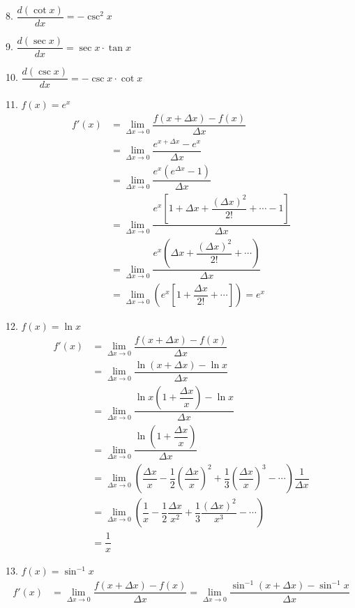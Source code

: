

8. $\dfrac{d (\cot x)}{dx} = -\csc^2 x$

9. $\dfrac{d (\sec x)}{dx} = \sec x \cdot \tan x$

10. $\dfrac{d (\csc x)}{dx} = -\csc x \cdot \cot x$

11. $f(x) = e^x$
\begin{align*}
    f'(x) &= \lim_{\Delta x \to 0} \dfrac{f(x+\Delta x) - f(x)}{\Delta x} \\
    &= \lim_{\Delta x \to 0} \dfrac{e^{x+\Delta x} - e^x}{\Delta x} \\
    &= \lim_{\Delta x \to 0} \dfrac{e^x \left(e^{\Delta x} - 1\right)}{\Delta x} \\
    &= \lim_{\Delta x \to 0} \dfrac{e^x \left[1 + \Delta x + \dfrac{(\Delta x)^2}{2!} + \dotsb - 1\right]}{\Delta x} \\
    &= \lim_{\Delta x \to 0} \dfrac{e^x \left(\Delta x + \dfrac{(\Delta x)^2}{2!} + \cdots \right)}{\Delta x} \\
    &= \lim_{\Delta x \to 0} \left( e^x \left[1 + \dfrac{\Delta x}{2!} + \dotsb \right] \right) = e^x
\end{align*}

12. $f(x) = \ln x$
\begin{align*}
    f'(x) &= \lim_{\Delta x \to 0} \dfrac{f(x+\Delta x) - f(x)}{\Delta x} \\
    &= \lim_{\Delta x \to 0} \dfrac{\ln (x+\Delta x) - \ln x}{\Delta x} \\
    &= \lim_{\Delta x \to 0} \dfrac{\ln x \left( 1 + \dfrac{\Delta x}{x} \right) - \ln x}{\Delta x} \\
    &= \lim_{\Delta x \to 0} \dfrac{\ln\left( 1 + \dfrac{\Delta x}{x} \right)}{\Delta x} \\
    &= \lim_{\Delta x \to 0} \left( \dfrac{\Delta x}{x} - \dfrac{1}{2} \left( \dfrac{\Delta x}{x} \right)^2 
    + \dfrac{1}{3} \left( \dfrac{\Delta x}{x} \right)^3 - \cdots \right) \dfrac{1}{\Delta x} \\
    &= \lim_{\Delta x \to 0} \left( \dfrac{1}{x} - \dfrac{1}{2} \dfrac{\Delta x}{x^2} 
    + \dfrac{1}{3} \dfrac{(\Delta x)^2}{x^3} - \cdots \right) \\
    &= \dfrac{1}{x}
\end{align*}

13. $f(x) = \sin^{-1} x$
\begin{align*}
    f'(x) &= \lim_{\Delta x \to 0} \dfrac{f(x+\Delta x) - f(x)}{\Delta x} = \lim_{\Delta x \to 0} 
    \dfrac{\sin^{-1} (x + \Delta x) - \sin^{-1} x}{\Delta x}
\end{align*}

